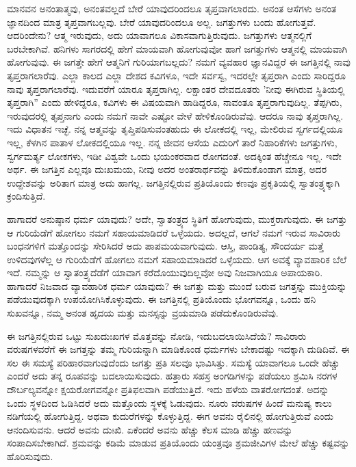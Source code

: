 ಮಾನವನ ಅನಂತಾತ್ಮವು, ಅನಂತವಲ್ಲದೆ ಬೇರೆ ಯಾವುದರಿಂದಲೂ ತೃಪ್ತವಾಗಲಾರದು. ಅನಂತ ಆಸೆಗಳು ಅನಂತ ಜ್ಞಾನದಿಂದ ಮಾತ್ರ ತೃಪ್ತವಾಗಬಲ್ಲವು. ಬೇರೆ ಯಾವುದರಿಂದಲೂ ಅಲ್ಲ. ಜಗತ್ತುಗಳು ಬಂದು ಹೋಗುತ್ತವೆ. ಆದರಿಂದೇನು? ಆತ್ಮ ಇರುವುದು, ಅದು ಯಾವಾಗಲೂ ವಿಕಾಸವಾಗುತ್ತಿರುವುದು. ಜಗತ್ತುಗಳು ಆತ್ಮನಲ್ಲಿಗೆ ಬರಬೇಕಾಗಿವೆ. ಹನಿಗಳು ಸಾಗರದಲ್ಲಿ ಹೇಗೆ ಮಾಯವಾಗಿ ಹೋಗುವುವೋ ಹಾಗೆ ಜಗತ್ತುಗಳು ಆತ್ಮನಲ್ಲಿ ಮಾಯವಾಗಿ ಹೋಗುವುವು. ಈ ಜಗತ್ತೇ ಹೇಗೆ ಆತ್ಮನಿಗೆ ಗುರಿಯಾಗಬಲ್ಲದು? ನಮಗೆ ವ್ಯವಹಾರ ಜ್ಞಾನವಿದ್ದರೆ ಈ ಜಗತ್ತಿನಲ್ಲಿ ನಾವು ತೃಪ್ತರಾಗಲಾರೆವು. ಎಲ್ಲಾ ಕಾಲದ ಎಲ್ಲಾ ದೇಶದ ಕವಿಗಳೂ, ಇದೇ ಸರ್ವಸ್ವ, ಇದರಲ್ಲೇ ತೃಪ್ತರಾಗಿ ಎಂದು ಸಾರಿದ್ದರೂ ನಾವು ತೃಪ್ತರಾಗಲಾರೆವು. ಇದುವರೆಗೆ ಯಾರೂ ತೃಪ್ತರಾಗಿಲ್ಲ. ಲಕ್ಷಾಂತರ ದೇವದೂತರು 'ನೀವು ಈಗಿರುವ ಸ್ಥಿತಿಯಲ್ಲಿ ತೃಪ್ತರಾಗಿ” ಎಂದು ಹೇಳಿದ್ದರೂ, ಕವಿಗಳು ಈ ವಿಷಯವಾಗಿ ಹಾಡಿದ್ದರೂ, ನಾವಂತೂ ತೃಪ್ತರಾಗುವುದಿಲ್ಲ. ತೆಪ್ಪಗಿರು, ಇರುವುದರಲ್ಲಿ ತೃಪ್ತನಾಗು ಎಂದು ನಮಗೆ ನಾವೇ ಎಷ್ಟೋ ವೇಳೆ ಹೇಳಿಕೊಂಡಿರುವೆವು. ಆದರೂ ನಾವು ತೃಪ್ತರಾಗಿಲ್ಲ. ಇದು ವಿಧಾತನ ಇಚ್ಛೆ. ನನ್ನ ಆತ್ಮವನ್ನು ತೃಪ್ತಿಪಡಿಸುವಂತಹುದು ಈ ಲೋಕದಲ್ಲಿ ಇಲ್ಲ, ಮೇಲಿರುವ ಸ್ವರ್ಗದಲ್ಲಿಯೂ ಇಲ್ಲ, ಕೆಳಗಿನ ಪಾತಾಳ ಲೋಕದಲ್ಲಿಯೂ ಇಲ್ಲ. ನನ್ನ ಜೀವನ ಆಸೆಯ ಎದುರಿಗೆ ತಾರೆ ನಿಹಾರಿಕೆಗಳು ಜಗತ್ತುಗಳು, ಸ್ವರ್ಗಮರ್ತ್ಯ ಲೋಕಗಳು, ಇಡೀ ವಿಶ್ವವೇ ಒಂದು ಭಯಂಕರವಾದ ರೋಗದಂತೆ. ಅದಕ್ಕಿಂತ ಹೆಚ್ಚೇನೂ ಇಲ್ಲ. ಇದೇ ಅರ್ಥ. ಈ ಜಗತ್ತಿನ ಎಲ್ಲವೂ ದುಃಖಮಯ, ನೀವು ಅದರ ಅಂತರಾರ್ಥವನ್ನು ತಿಳಿದುಕೊಂಡಾಗ ಮಾತ್ರ, ಅದರ ಉದ್ದೇಶವನ್ನು ಅರಿತಾಗ ಮಾತ್ರ ಅದು ಹಾಗಲ್ಲ. ಜಗತ್ತಿನಲ್ಲಿರುವ ಪ್ರತಿಯೊಂದು ಕಣವೂ ಪ್ರಕೃತಿಯಲ್ಲಿ ಸ್ವಾತಂತ್ರ್ಯಕ್ಕಾಗಿ ಕ್ರಂದಿಸುತ್ತಿದೆ.

ಹಾಗಾದರೆ ಅನುಷ್ಠಾನ ಧರ್ಮ ಯಾವುದು? ಅದೇ, ಸ್ವಾತಂತ್ರ್ಯದ ಸ್ಥಿತಿಗೆ ಹೋಗುವುದು, ಮುಕ್ತರಾಗುವುದು. ಈ ಜಗತ್ತು ಆ ಗುರಿಯೆಡೆಗೆ ಹೋಗಲು ನಮಗೆ ಸಹಾಯಮಾಡಿದರೆ ಒಳ್ಳೆಯದು. ಅದಲ್ಲದೆ, ಆಗಲೆ ನಮಗೆ ಇರುವ ಸಾವಿರಾರು ಬಂಧನಗಳಿಗೆ ಮತ್ತೊಂದನ್ನು ಸೇರಿಸಿದರೆ ಅದು ಪಾಪಮಯವಾಗುವುದು. ಆಸ್ತಿ, ಪಾಂಡಿತ್ಯ, ಸೌಂದರ್ಯ ಮತ್ತೆ ಉಳಿದವುಗಳೆಲ್ಲ ಆ ಗುರಿಯೆಡೆಗೆ ಹೋಗಲು ನಮಗೆ ಸಹಾಯಮಾಡಿದರೆ ಒಳ್ಳೆಯದು. ಆಗ ಅವಕ್ಕೆ ವ್ಯಾವಹಾರಿಕ ಬೆಲೆ ಇದೆ. ನಮ್ಮನ್ನು ಆ ಸ್ವಾತಂತ್ರ್ಯದೆಡೆಗೆ ಯಾವಾಗ ಕರೆದೊಯುವುದಿಲ್ಲವೋ ಅವು ನಿಜವಾಗಿಯೂ ಅಪಾಯಕಾರಿ. ಹಾಗಾದರೆ ನಿಜವಾದ ವ್ಯಾವಹಾರಿಕ ಧರ್ಮ ಯಾವುದು? ಈ ಜಗತ್ತು ಮತ್ತು ಮುಂದೆ ಬರುವ ಜಗತ್ತನ್ನು ಮುಕ್ತಿಯನ್ನು ಪಡೆಯುವುದಕ್ಕಾಗಿ ಉಪಯೋಗಿಸಿಕೊಳ್ಳುವುದು. ಈ ಜಗತ್ತಿನಲ್ಲಿ ಪ್ರತಿಯೊಂದು ಭೋಗವನ್ನೂ, ಒಂದು ಹನಿ ಸುಖವನ್ನೂ, ನಮ್ಮ ಅನಂತ ಹೃದಯ ಮತ್ತು ಮನಸ್ಸನ್ನು ವ್ರಯಮಾಡಿ ಪಡೆದುಕೊಂಡಿರುವೆವು.

ಈ ಜಗತ್ತಿನಲ್ಲಿರುವ ಒಟ್ಟು ಸುಖದುಃಖಗಳ ಮೊತ್ತವನ್ನು ನೋಡಿ, ಇದು\break ಬದಲಾಯಿಸಿದೆಯೆ? ಸಾವಿರಾರು ವರುಷಗಳವರೆಗೆ ಈ ಜಗತ್ತನ್ನು ತಮ್ಮ ಗುರಿಯನ್ನಾಗಿ ಮಾಡಿಕೊಂಡ ಧರ್ಮಗಳು ಬೇಕಾದಷ್ಟು ಇದಕ್ಕಾಗಿ ದುಡಿದಿವೆ. ಈ ಸಲ ಈ ಸಮಸ್ಯೆ ಪರಿಹಾರವಾಗುವುದೆಂದು ಜಗತ್ತು ಪ್ರತಿ ಸಲವೂ ಭಾವಿಸಿತ್ತು. ಸಮಸ್ಯೆ ಯಾವಾಗಲೂ ಒಂದೇ ಹೆಚ್ಚು ಎಂದರೆ ಅದು ತನ್ನ ರೂಪವನ್ನು ಬದಲಾಯಿಸುವುದು. ಹತ್ತಾರು ಸಹಸ್ರ ಅಂಗಡಿಗಳನ್ನು ಪಡೆಯಲು ಶ್ರಮಿಸಿ ನರಗಳ ದೌರ್ಬಲ್ಯವನ್ನೋ ಕ್ಷಯರೋಗವನ್ನೋ ಪ್ರತಿಫಲವಾಗಿ ಪಡೆಯುತ್ತಿದೆ. ಇದು ಹಳೆಯ ವಾತರೋಗದಂತೆ. ಅದನ್ನು ಒಂದು ಸ್ಥಳದಿಂದ ಓಡಿಸಿದರೆ ಅದು ಮತ್ತೊಂದು ಸ್ಥಳಕ್ಕೆ ಓಡುವುದು. ನೂರು ವರುಷಗಳ ಹಿಂದೆ ಮನುಷ್ಯ ಕಾಲು ನಡಿಗೆಯಲ್ಲಿ ಹೋಗುತ್ತಿದ್ದ. ಅಥವಾ ಕುದುರೆಗಳನ್ನು ಕೊಳ್ಳುತ್ತಿದ್ದ. ಈಗ ಅವನು ರೈಲಿನಲ್ಲಿ ಹೋಗುತ್ತಿರುವೆ ಎಂದು ಆನಂದಿಸುವನು. ಆದರೆ ಅವನು ದುಃಖಿ. ಏಕೆಂದರೆ ಅವನು ಹೆಚ್ಚು ಕೆಲಸ ಮಾಡಿ ಹೆಚ್ಚು ಹಣವನ್ನು ಸಂಪಾದಿಸಬೇಕಾಗಿದೆ. ಶ್ರಮವನ್ನು ಕಡಿಮೆ ಮಾಡುವ ಪ್ರತಿಯೊಂದು ಯಂತ್ರವೂ ಶ್ರಮಜೀವಿಗಳ ಮೇಲೆ ಹೆಚ್ಚು ಕಷ್ಟವನ್ನು ಹೊರಿಸುವುದು.


